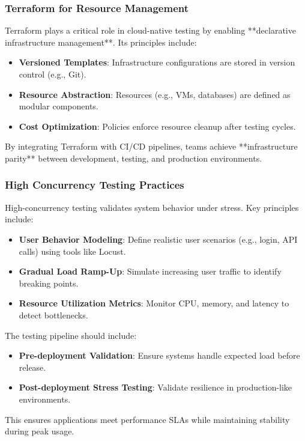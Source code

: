 \documentclass[manuscript,screen,review]{acmart}
\begin{document}
\subsubsection{Terraform for Resource Management}

Terraform plays a critical role in cloud-native testing by enabling **declarative infrastructure management**. Its principles include:
\begin{itemize}
    \item \textbf{Versioned Templates}: Infrastructure configurations are stored in version control (e.g., Git).
    \item \textbf{Resource Abstraction}: Resources (e.g., VMs, databases) are defined as modular components.
    \item \textbf{Cost Optimization}: Policies enforce resource cleanup after testing cycles.
\end{itemize}

By integrating Terraform with CI/CD pipelines, teams achieve **infrastructure parity** between development, testing, and production environments.

\subsubsection{High Concurrency Testing Practices}

High-concurrency testing validates system behavior under stress. Key principles include:
\begin{itemize}
    \item \textbf{User Behavior Modeling}: Define realistic user scenarios (e.g., login, API calls) using tools like Locust.
    \item \textbf{Gradual Load Ramp-Up}: Simulate increasing user traffic to identify breaking points.
    \item \textbf{Resource Utilization Metrics}: Monitor CPU, memory, and latency to detect bottlenecks.
\end{itemize}

The testing pipeline should include:
\begin{itemize}
    \item \textbf{Pre-deployment Validation}: Ensure systems handle expected load before release.
    \item \textbf{Post-deployment Stress Testing}: Validate resilience in production-like environments.
\end{itemize}

This ensures applications meet performance SLAs while maintaining stability during peak usage.
\end{document}
